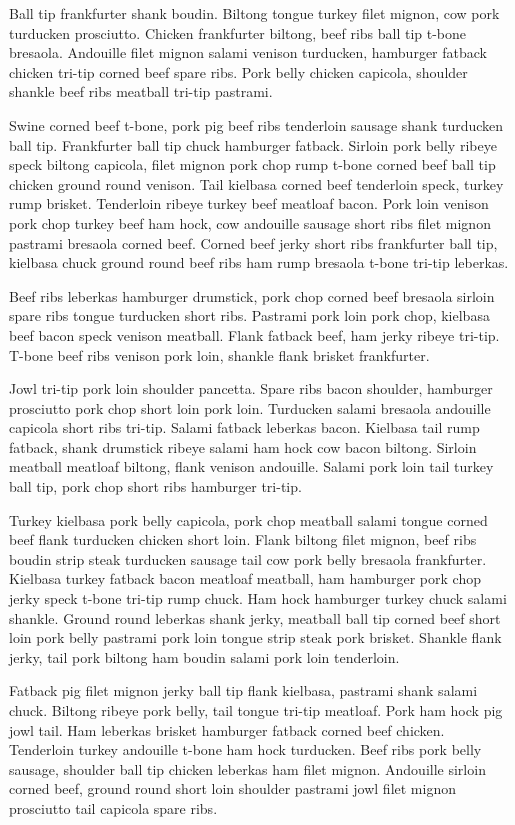 Ball tip frankfurter shank boudin. Biltong tongue turkey filet mignon, cow pork turducken prosciutto. Chicken frankfurter biltong, beef ribs ball tip t-bone bresaola. Andouille filet mignon salami venison turducken, hamburger fatback chicken tri-tip corned beef spare ribs. Pork belly chicken capicola, shoulder shankle beef ribs meatball tri-tip pastrami.

Swine corned beef t-bone, pork pig beef ribs tenderloin sausage shank turducken ball tip. Frankfurter ball tip chuck hamburger fatback. Sirloin pork belly ribeye speck biltong capicola, filet mignon pork chop rump t-bone corned beef ball tip chicken ground round venison. Tail kielbasa corned beef tenderloin speck, turkey rump brisket. Tenderloin ribeye turkey beef meatloaf bacon. Pork loin venison pork chop turkey beef ham hock, cow andouille sausage short ribs filet mignon pastrami bresaola corned beef. Corned beef jerky short ribs frankfurter ball tip, kielbasa chuck ground round beef ribs ham rump bresaola t-bone tri-tip leberkas.

Beef ribs leberkas hamburger drumstick, pork chop corned beef bresaola sirloin spare ribs tongue turducken short ribs. Pastrami pork loin pork chop, kielbasa beef bacon speck venison meatball. Flank fatback beef, ham jerky ribeye tri-tip. T-bone beef ribs venison pork loin, shankle flank brisket frankfurter.

Jowl tri-tip pork loin shoulder pancetta. Spare ribs bacon shoulder, hamburger prosciutto pork chop short loin pork loin. Turducken salami bresaola andouille capicola short ribs tri-tip. Salami fatback leberkas bacon. Kielbasa tail rump fatback, shank drumstick ribeye salami ham hock cow bacon biltong. Sirloin meatball meatloaf biltong, flank venison andouille. Salami pork loin tail turkey ball tip, pork chop short ribs hamburger tri-tip.

Turkey kielbasa pork belly capicola, pork chop meatball salami tongue corned beef flank turducken chicken short loin. Flank biltong filet mignon, beef ribs boudin strip steak turducken sausage tail cow pork belly bresaola frankfurter. Kielbasa turkey fatback bacon meatloaf meatball, ham hamburger pork chop jerky speck t-bone tri-tip rump chuck. Ham hock hamburger turkey chuck salami shankle. Ground round leberkas shank jerky, meatball ball tip corned beef short loin pork belly pastrami pork loin tongue strip steak pork brisket. Shankle flank jerky, tail pork biltong ham boudin salami pork loin tenderloin.

Fatback pig filet mignon jerky ball tip flank kielbasa, pastrami shank salami chuck. Biltong ribeye pork belly, tail tongue tri-tip meatloaf. Pork ham hock pig jowl tail. Ham leberkas brisket hamburger fatback corned beef chicken. Tenderloin turkey andouille t-bone ham hock turducken. Beef ribs pork belly sausage, shoulder ball tip chicken leberkas ham filet mignon. Andouille sirloin corned beef, ground round short loin shoulder pastrami jowl filet mignon prosciutto tail capicola spare ribs.

